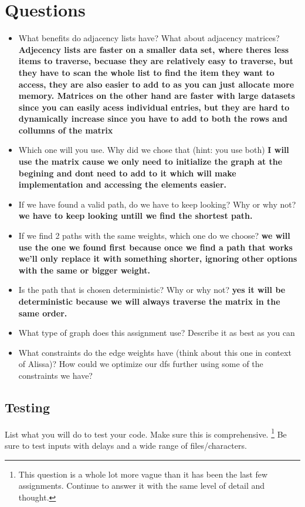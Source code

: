 \documentclass{article}
\begin{document}
\section*{Questions}
\begin{itemize}
    \item What benefits do adjacency lists have? What about adjacency matrices? \textbf{Adjecency lists are faster on a smaller data set, where theres less items to traverse, becuase they are relatively easy to traverse, but they have to scan the whole list to find the item they want to access, they are also easier to add to as you can just allocate more memory. Matrices on the other hand are faster with large datasets since you can easily acess individual entries, but they are hard to dynamically increase since you have to add to both the rows and collumns of the matrix }
    \item Which one will you use. Why did we chose that (hint: you use both) \textbf{I will use the matrix cause we only need to initialize the graph at the begining and dont need to add to it which will make implementation and accessing the elements easier.}
    \item If we have found a valid path, do we have to keep looking? Why or why not? \textbf{we have to keep looking untill we find the shortest path.}
    \item If we find 2 paths with the same weights, which one do we choose? \textbf{we will use the one we found first because once we find a path that works we'll only replace it with something shorter, ignoring other options with the same or bigger weight.}
    \item Is the path that is chosen deterministic? Why or why not? \textbf{yes it will be deterministic because we will always traverse the matrix in the same order.}
    \item What type of graph does this assignment use? Describe it as best as you can \textbf{ } 
    \item What constraints do the edge weights have (think about this one in context of Alissa)? How could we optimize our dfs further using some of the constraints we have?
    
\end{itemize}


\subsection*{Testing}
List what you will do to test your code. Make sure this is comprehensive. \footnote{This question is a whole lot more vague than it has been the last few assignments. Continue to answer it with the same level of detail and thought.} Be sure to test inputs with delays and a wide range of files/characters.
\end{document}
